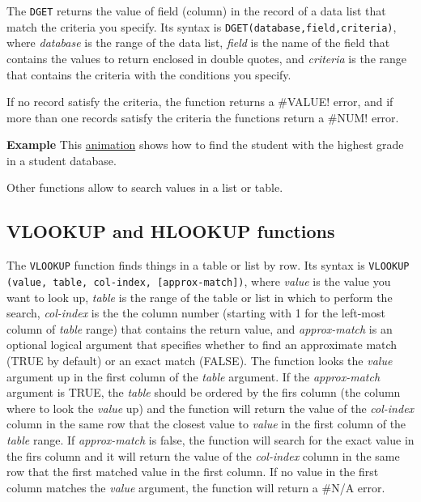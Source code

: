 The \texttt{DGET} returns the value of field (column) in the record of a data list that match the criteria you specify.
Its syntax is \texttt{DGET(database,field,criteria)}, where \emph{database} is the range of the data list, \emph{field}
is the name of the field that contains the values to return enclosed in double quotes, and \emph{criteria} is the range that contains the criteria with the conditions you specify.

If no record satisfy the criteria, the function returns a #VALUE! error, and if more than one records satisfy the
criteria the functions return a #NUM! error.  

\textbf{Example} This \href{http://aprendeconalf.es/office/excel/manual/img/example_function_dget.gif}{animation} shows how to find the student with the highest grade in a student database.
 
Other functions allow to search values in a list or table.

\subsection{VLOOKUP and HLOOKUP functions}\hypertarget{vlookup-and-hlookup-functions}{}\label{vlookup-and-hlookup-functions}

The \texttt{VLOOKUP} function finds things in a table or list by row. Its syntax is \texttt{VLOOKUP (value, table, col-index, [approx-match])}, where \emph{value} is the value you want to look up, \emph{table} is the range of the table or list in which to perform the search, \emph{col-index} is the the column number (starting with 1 for the left-most column of \emph{table} range) that contains the return value, and \emph{approx-match} is an optional logical argument that specifies whether to find an approximate match (TRUE by default) or an exact match (FALSE). The function looks the \emph{value} argument up in the first column of the \emph{table} argument. If the \emph{approx-match} argument is TRUE, the \emph{table} should be ordered by the firs column (the column where to look the \emph{value} up) and the function will return the value of the \emph{col-index} column in the same row that the closest value to \emph{value} in the first column of the \emph{table} range. If \emph{approx-match} is false, the function will search for the exact value in the firs column and it will return the value of the \emph{col-index} column in the same row that the first matched value in the first column. If no value in the first column matches the \emph{value} argument, the function will return a \#N/A error.

